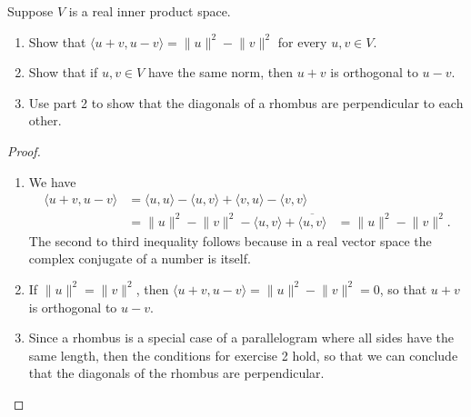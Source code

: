 \begin{exercise}{4}
  Suppose $V$ is a real inner product space.
    \begin{enumerate}
        \item Show that $\langle u+v,u-v\rangle=\lVert u\rVert^2-\lVert v\rVert^2$ for every $u,v\in V$.
        \item Show that if $u,v\in V$ have the same norm, then $u+v$ is orthogonal to $u-v$.
        \item Use part 2 to show that the diagonals of a rhombus are perpendicular to each other.
    \end{enumerate}  
\end{exercise}
\begin{proof}
 \begin{enumerate}
     \item We have 
     \begin{align*}
        \langle u+v,u-v\rangle &= \langle u,u\rangle-\langle u,v\rangle+\langle v,u\rangle-\langle v,v\rangle\\
        &= \lVert u\rVert^2-\lVert v\rVert^2 -\langle u,v\rangle+\overline{\langle u,v\rangle}
        &= \lVert u\rVert^2-\lVert v\rVert^2.
     \end{align*}
     The second to third inequality follows because in a real vector space the complex conjugate of a number is itself.
     \item If $\lVert u\rVert^2=\lVert v\rVert^2$, then $\langle u+v,u-v\rangle=\lVert u\rVert^2-\lVert v\rVert^2=0$, so that $u+v$ is orthogonal to $u-v$.
     \item Since a rhombus is a special case of a parallelogram where all sides have the same length, then the conditions for exercise 2 hold, so that we can conclude that the diagonals of the rhombus are perpendicular.
 \end{enumerate}
\end{proof}


